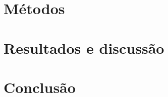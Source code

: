 \documentclass[12pt, a4paper]{article}
\begin{document}
\section{Métodos}
\section{Resultados e discussão}
\section{Conclusão}

\printbibliography
\end{document}
